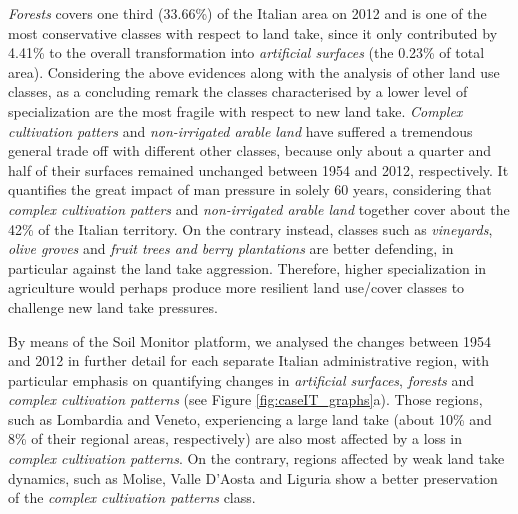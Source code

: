 \documentclass[APA,LATO1COL,doublespace]{WileyNJD-v2}
\newcommand{\toberevised}[1]{\emph{\textcolor{red}{#1}}} %
\begin{document}
\textit{Forests} covers one third (33.66\%) of the Italian area on 2012 and is one of the most conservative classes with respect to land take, since it only contributed by 4.41\% to the overall transformation into \textit{artificial surfaces} (the 0.23\% of total area).
Considering the above evidences along with the analysis of other land use classes, as a concluding remark the classes characterised by a lower level of specialization are the most fragile with respect to new land take.
\textit{Complex cultivation patters} and \textit{non-irrigated arable land} have suffered a tremendous general trade off with different other classes, because only about a quarter and half of their surfaces remained unchanged between 1954 and 2012, respectively.
It quantifies the great impact of man pressure in solely 60 years, considering that \textit{complex cultivation patters} and \textit{non-irrigated arable land} together cover about the 42\% of the Italian territory.
On the contrary instead, classes such as \textit{vineyards}, \textit{olive groves} and \textit{fruit trees and berry plantations} are better defending, in particular against the land take aggression.
Therefore, higher specialization in agriculture would perhaps produce more resilient land use/cover classes to challenge new land take pressures.

By means of the Soil Monitor platform, we analysed the changes between 1954 and 2012 in further detail
for each separate Italian administrative region, with particular emphasis on quantifying changes in \textit{artificial surfaces}, \textit{forests} and \textit{complex cultivation patterns} (see Figure \ref{fig:caseIT_graphs}a).
Those regions, such as Lombardia and Veneto, experiencing a large land take (about 10\% and 8\% of their regional areas, respectively) are also most affected by a loss in \textit{complex cultivation patterns}.
On the contrary, regions affected by weak land take dynamics, such as Molise, Valle D'Aosta and Liguria show a better preservation of the \textit{complex cultivation patterns} class.%
\end{document}
